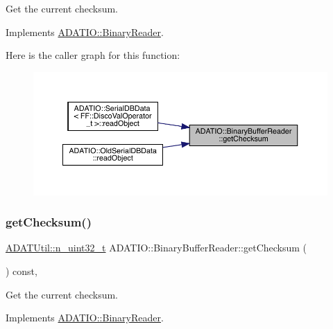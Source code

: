 Get the current checksum. 



Implements \mbox{\hyperlink{classADATIO_1_1BinaryReader_acd705bb96d557a5437410b55beb40bda}{A\+D\+A\+T\+I\+O\+::\+Binary\+Reader}}.

Here is the caller graph for this function\+:\nopagebreak
\begin{figure}[H]
\begin{center}
\leavevmode
\includegraphics[width=350pt]{d0/df3/classADATIO_1_1BinaryBufferReader_ae8e6c22be76223f5e2ce2613e70be4bf_icgraph}
\end{center}
\end{figure}
\mbox{\label{classADATIO_1_1BinaryBufferReader_ae8e6c22be76223f5e2ce2613e70be4bf}} 
\subsubsection{\texorpdfstring{getChecksum()}{getChecksum()}\hspace{0.1cm}{\footnotesize\ttfamily [2/2]}}
{\footnotesize\ttfamily \mbox{\hyperlink{namespaceADATUtil_ad945a8afa4db2d1f89b731964adae97e}{A\+D\+A\+T\+Util\+::n\+\_\+uint32\+\_\+t}} A\+D\+A\+T\+I\+O\+::\+Binary\+Buffer\+Reader\+::get\+Checksum (\begin{DoxyParamCaption}{ }\end{DoxyParamCaption}) const\hspace{0.3cm}{\ttfamily [inline]}, {\ttfamily [virtual]}}



Get the current checksum. 



Implements \mbox{\hyperlink{classADATIO_1_1BinaryReader_acd705bb96d557a5437410b55beb40bda}{A\+D\+A\+T\+I\+O\+::\+Binary\+Reader}}.

